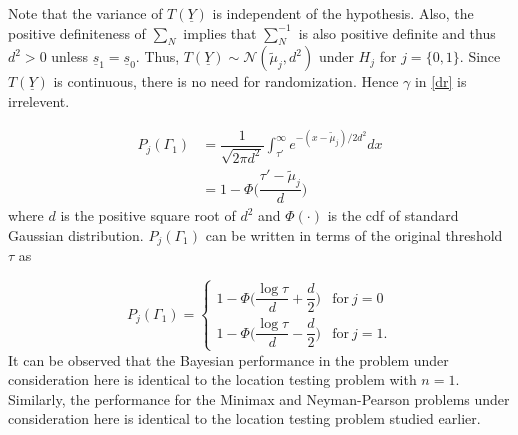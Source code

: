 \documentclass[a4paper,english,12pt]{article}
\begin{document}
Note that the variance of $T(\underline{Y})$ is independent of the hypothesis. Also, the positive definiteness of $\sum _N$ implies that $\sum _N^{-1}$ is also positive definite and thus $d^2 >0$ unless $\underline{s}_1 = \underline{s}_0$. Thus, $T(\underline{Y}) \sim \mathcal{N}(\tilde{\mu}_j,d^2)$ under $H_j$ for $j=\{0,1\}$. Since $T(\underline{Y})$ is continuous, there is no need for randomization. Hence $\gamma$ in \eqref{dr} is irrelevent. 

\begin{align}
P_j(\Gamma_1) &= \dfrac{1}{\sqrt{2\pi d^2}} \int_{\tau'}^{\infty} e^{-(x-\tilde{\mu}_j)/2d^2} dx \nonumber \\
&=1-\Phi \Big( \dfrac{\tau' - \tilde{\mu}_j}{d} \Big)
\label{pg1}
\end{align}
\noindent where $d$ is the positive square root of $d^2$ and $\Phi(\cdot)$ is the cdf of standard Gaussian distribution. $P_j(\Gamma_1)$ can be written in terms of the original threshold $\tau$ as

\begin{equation}
P_j(\Gamma_1) = 
\begin{cases}
1-\Phi \Big(\dfrac{\log \tau}{d} + \dfrac{d}{2} \Big) &\mbox{for}~j=0\\
1-\Phi \Big(\dfrac{\log \tau}{d} - \dfrac{d}{2} \Big) &\mbox{for}~j=1.
\end{cases}
\end{equation}  
It can be observed that the Bayesian performance in the problem under consideration here is identical to the location testing problem with $n=1$. Similarly, the performance for the Minimax and Neyman-Pearson problems under consideration here is identical to the location testing problem studied earlier.
\end{document}

